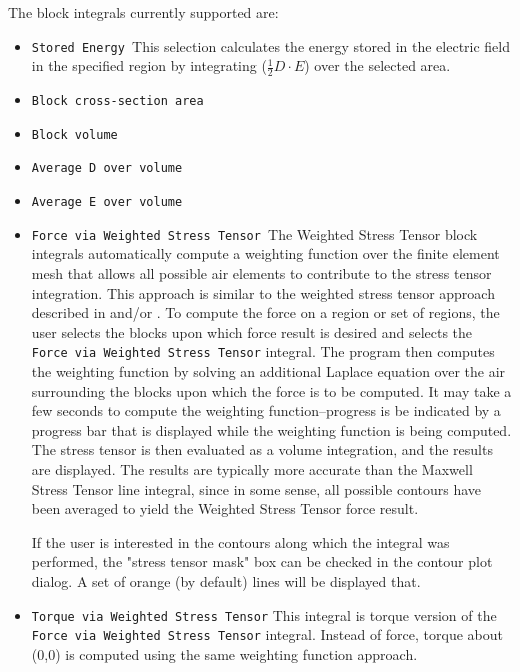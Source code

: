 \documentclass[12pt]{report}
\begin{document}
The block integrals currently supported are:


\begin{itemize}


\item \texttt{Stored Energy }This selection calculates the energy stored in the
electric field in the specified region by integrating ($\frac{1}{2}
D \cdot E$) over the selected area.

\item \texttt{Block cross-section area}

\item \texttt{Block volume}

\item \texttt{Average D over volume}

\item \texttt{Average E over volume}

\item \texttt{Force via Weighted Stress Tensor }The Weighted Stress Tensor block
integrals automatically compute a weighting function over the
finite element mesh that allows all possible air elements to
contribute to the stress tensor integration. This approach is
similar to the weighted stress tensor approach described in
\cite{mcfee} and/or \cite{henforce}. To compute the force on a region or
set of regions, the user selects the blocks upon which force result
is desired and selects the \texttt{Force via Weighted Stress
Tensor} integral. The program then computes the weighting function
by solving an additional Laplace equation over the air surrounding
the blocks upon which the force is to be computed. It may take a
few seconds to compute the weighting function--progress is be
indicated by a progress bar that is displayed while the weighting
function is being computed. The stress tensor is then evaluated as
a volume integration, and the results are displayed. The results
are typically more accurate than the Maxwell Stress Tensor line
integral, since in some sense, all possible contours have been
averaged to yield the Weighted Stress Tensor force result.


If the user is interested in the contours along which the integral was
performed, the "stress tensor mask" box can be checked in the contour plot
dialog. A set of orange (by default) lines will be displayed that.

\item \texttt{Torque via Weighted Stress Tensor} This integral is torque version
of the \texttt{Force via Weighted Stress Tensor} integral. Instead
of force, torque about (0,0) is computed using the same weighting
function approach.
\end{itemize}
\end{document}

